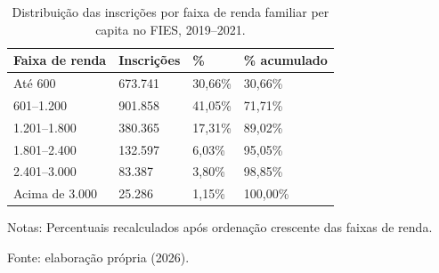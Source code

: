 \begin{table}[htbp]
\centering
\caption{Distribuição das inscrições por faixa de renda familiar per capita no FIES, 2019–2021.}
\label{tab:tabela_b1_distribuicao_inscricoes_por_faixa_renda}
\small
\begin{tabular}{llll}
\toprule
\rowcolor[gray]{0.85}
Faixa de renda & Inscrições & \% & \% acumulado \\
\midrule
Até 600 & 673.741 & 30,66\% & 30,66\% \\
\rowcolor[gray]{0.95}
601–1.200 & 901.858 & 41,05\% & 71,71\% \\
1.201–1.800 & 380.365 & 17,31\% & 89,02\% \\
\rowcolor[gray]{0.95}
1.801–2.400 & 132.597 & 6,03\% & 95,05\% \\
2.401–3.000 & 83.387 & 3,80\% & 98,85\% \\
\rowcolor[gray]{0.95}
Acima de 3.000 & 25.286 & 1,15\% & 100,00\% \\
\bottomrule
\end{tabular}
\par\footnotesize{Notas: Percentuais recalculados após ordenação crescente das faixas de renda.}
\par\footnotesize{Fonte: elaboração própria (2026).}
\end{table}
